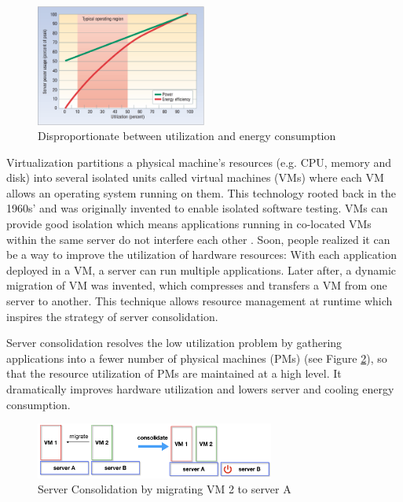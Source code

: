 \begin{figure}[H]
	\centering
	\includegraphics[width=0.5\textwidth]{pics/util.png}
	\caption{Disproportionate between utilization and energy consumption \cite{Barroso:2007jt}}
	\label{fig:unproportional}
\end{figure} 

Virtualization \cite{Uhlig:2005do} partitions a physical machine's resources (e.g. CPU, memory and disk) into several isolated units called virtual machines (VMs) where each VM allows an operating system running on them. This technology rooted back in the 1960s' and was originally invented to enable isolated software testing. VMs can provide good isolation which means applications running in co-located VMs within the same server do not interfere each other \cite{Somani:2009ho}.  Soon, people realized it can be a way to improve the utilization of hardware resources: With each application deployed in a VM, a server can run multiple applications. Later after, a dynamic migration of VM was invented, which compresses and transfers a VM from one server to another. This technique allows resource management at runtime which inspires the strategy of server consolidation. 



Server consolidation \cite{Zhang:2010vo} resolves the low utilization problem by gathering applications into a fewer number of physical machines (PMs) (see Figure \ref{fig:unproportional}), so that the resource utilization of PMs are maintained at a high level. It dramatically improves hardware utilization and lowers server and cooling energy consumption. 

\begin{figure}
	\centering
	\includegraphics[width=0.7\textwidth]{pics/consolidate.png}
	\caption{Server Consolidation by migrating VM 2 to server A \cite{Barroso:2007jt}}
	\label{fig:unproportional}
\end{figure} 

